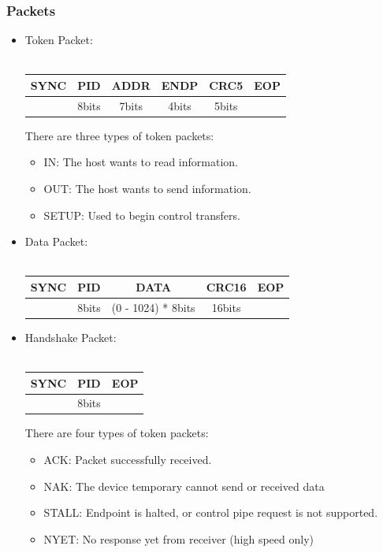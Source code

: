 \documentclass[pdftex,12pt,a4paper]{report}
\begin{document}
\subsubsection{Packets}
\begin{itemize}
	\item Token Packet: \\ \\
		\begin{tabular}{|c|c|c|c|c|c|}
  	\hline
  		SYNC & PID & ADDR & ENDP & CRC5 & EOP \\ \hline
  		 & 8bits & 7bits & 4bits & 5bits &  \\
  	\hline
  	\end{tabular}
  	
  	There are three types of token packets: 
  	\begin{itemize}
			\item IN: The host wants to read information.
			\item OUT: The host wants to send information.
			\item SETUP: Used to begin control transfers.
  	\end{itemize}
  	
  	
	\item Data Packet: \\ \\
		\begin{tabular}{|c|c|c|c|c|}
  	\hline
  		SYNC & PID & DATA & CRC16 & EOP \\ \hline
  		 & 8bits & (0 - 1024) * 8bits & 16bits &   \\
  	\hline
  	\end{tabular}
  	
  	
	\item Handshake Packet: \\ \\
		\begin{tabular}{|c|c|c|}
  	\hline
  		SYNC & PID & EOP \\ \hline
  		 & 8bits &  \\
  	\hline
  	\end{tabular}
  	
  	There are four types of token packets: 
  	\begin{itemize}
			\item ACK: Packet successfully received.
			\item NAK: The device temporary cannot send or received data
			\item STALL: Endpoint is halted, or control pipe request is not supported.
			\item NYET: No response yet from receiver (high speed only)
  	\end{itemize}
  	
  	
\end{itemize}
\end{document}
